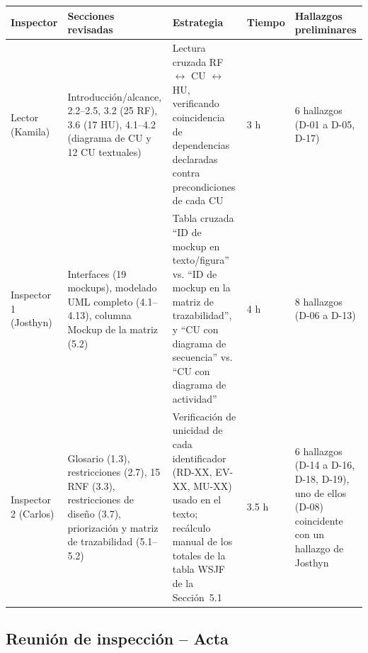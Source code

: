 \documentclass[11pt,a4paper]{article}
\begin{document}
\begin{longtable}{|p{2.3cm}|p{3.9cm}|p{1.8cm}|p{1.2cm}|p{3.9cm}|}
\hline
\textbf{Inspector} & \textbf{Secciones revisadas} & \textbf{Estrategia} & \textbf{Tiempo} & \textbf{Hallazgos preliminares} \\
\hline
Lector (Kamila) & Introducción/alcance, 2.2--2.5, 3.2 (25 RF), 3.6 (17 HU), 4.1--4.2 (diagrama de CU y 12 CU textuales) & Lectura cruzada RF $\leftrightarrow$ CU $\leftrightarrow$ HU, verificando coincidencia de dependencias declaradas contra precondiciones de cada CU & 3 h & 6 hallazgos (D-01 a D-05, D-17) \\
\hline
Inspector 1 (Josthyn) & Interfaces (19 mockups), modelado UML completo (4.1--4.13), columna Mockup de la matriz (5.2) & Tabla cruzada ``ID de mockup en texto/figura'' vs. ``ID de mockup en la matriz de trazabilidad'', y ``CU con diagrama de secuencia'' vs. ``CU con diagrama de actividad'' & 4 h & 8 hallazgos (D-06 a D-13) \\
\hline
Inspector 2 (Carlos) & Glosario (1.3), restricciones (2.7), 15 RNF (3.3), restricciones de diseño (3.7), priorización y matriz de trazabilidad (5.1--5.2) & Verificación de unicidad de cada identificador (RD-XX, EV-XX, MU-XX) usado en el texto; recálculo manual de los totales de la tabla WSJF de la Sección~5.1 & 3.5 h & 6 hallazgos (D-14 a D-16, D-18, D-19), uno de ellos (D-08) coincidente con un hallazgo de Josthyn \\
\hline
\end{longtable}

\subsection{Reunión de inspección -- Acta}
\end{document}
